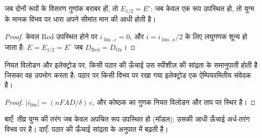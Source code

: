 \begin{corollary}[अर्ध-तरंग विभव]\label{cor:b2:current-potential-curves:half-wave}
जब दोनों रूपों के विसरण गुणांक बराबर हों, तो $E_{1/2} = E^\circ$: जब
केवल एक रूप उपस्थित हो, तो युग्म के मानक विभव पर धारा अपने सीमांत मान की
आधी होती है।
\end{corollary}

\begin{proof}
केवल Red उपस्थित होने पर $i_{\lim,c} = 0$, और $i = i_{\lim,a}/2$ के लिए लघुगणक
शून्य हो जाता है: $E = E_{1/2} = E^\circ$ जब $D_{\text{Red}} = D_{\text{Ox}}$।
\end{proof}

\begin{proposition}[पठार सांद्रताएँ मापते हैं]\label{prop:b2:current-potential-curves:plateau}
नियत विलोडन और इलेक्ट्रोड पर, किसी पठार की ऊँचाई उस स्पीशीज़ की
सांद्रता के समानुपाती होती है जिसका वह उपभोग करता है: पठार पर किसी विभव पर
रखा गया इलेक्ट्रोड एक ऐम्पियरमितीय संवेदक है।
\end{proposition}

\begin{proof}
$|i_{\lim}| = (nFAD/\delta)\,c$, और कोष्ठक का गुणक नियत
विलोडन और ताप पर स्थिर है।
\end{proof}

\begin{omfigure}
\hfill
{}

{\small बाएँ: तीव्र युग्म की तरंग जब केवल अपचित रूप उपस्थित हो
(मॉडल); उसकी आधी ऊँचाई अर्ध-तरंग विभव पर है। दाएँ: पठार की
ऊँचाई सांद्रता के अनुपात में बढ़ती है।}
\end{omfigure}

